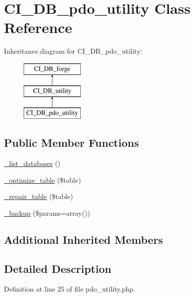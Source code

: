 \hypertarget{class_c_i___d_b__pdo__utility}{\section{C\-I\-\_\-\-D\-B\-\_\-pdo\-\_\-utility Class Reference}
\label{class_c_i___d_b__pdo__utility}
}
Inheritance diagram for C\-I\-\_\-\-D\-B\-\_\-pdo\-\_\-utility\-:\begin{figure}[H]
\begin{center}
\leavevmode
\includegraphics[height=3.000000cm]{class_c_i___d_b__pdo__utility}
\end{center}
\end{figure}
\subsection*{Public Member Functions}
\begin{DoxyCompactItemize}
\item 
\hyperlink{class_c_i___d_b__pdo__utility_aa047e69a7e732ca7280270f87f82bb3a}{\-\_\-list\-\_\-databases} ()
\item 
\hyperlink{class_c_i___d_b__pdo__utility_a4856292816fbbc8e9d927f565766727b}{\-\_\-optimize\-\_\-table} (\$table)
\item 
\hyperlink{class_c_i___d_b__pdo__utility_a7f40d4a3d78917e455e315cf708842ef}{\-\_\-repair\-\_\-table} (\$table)
\item 
\hyperlink{class_c_i___d_b__pdo__utility_a30f3053d2c82e7562349924363507afa}{\-\_\-backup} (\$params=array())
\end{DoxyCompactItemize}
\subsection*{Additional Inherited Members}


\subsection{Detailed Description}


Definition at line 25 of file pdo\-\_\-utility.\-php.



